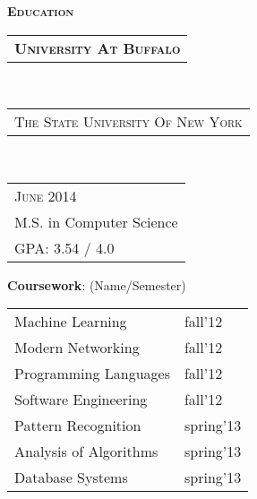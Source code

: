 \documentclass[10pt,letterpaper,oneside]{article}
\begin{document}
    \hspace{2ex}
    \begin{minipage}[t]{0.33\textwidth}
        \vspace{0pt}
        \textcolor{light-gray}{\textbf{\large E\textsc{ducation}}}
        \vspace{10pt}\\
        \begin{tabular}{c}
            \textbf{\normalsize U\textsc{niversity} A\textsc{t} B\textsc{uffalo}}
        \end{tabular}\\
        \textcolor{light-gray}{
            \begin{tabular}{l}
                {\small T\textsc{he} S\textsc{tate} U\textsc{niversity} O\textsc{f} N\textsc{ew} Y\textsc{ork}}
            \end{tabular}
        }\\ 
        \begin{tabular}{l}
            {\small J\textsc{une} 2014}\\
            {\small M.S. in Computer Science }\\
            {\small GPA: 3.54 / 4.0}
        \end{tabular}
        \vspace{0pt}
        \begin{adjustwidth}{7pt}{0pt}
            {\small \textbf{Coursework}: (Name/Semester)}\\
        \end{adjustwidth}
        \vspace{-11pt}
        \begin{adjustwidth}{7pt}{0pt}
            \begin{tabular}{ll}
                { \footnotesize Machine Learning } & {\footnotesize fall'12}\\                
                { \footnotesize Modern Networking } & {\footnotesize fall'12}\\
                { \footnotesize Programming Languages } & {\footnotesize fall'12}\\
                { \footnotesize Software Engineering } & {\footnotesize fall'12}\\
                { \footnotesize Pattern Recognition } & {\footnotesize spring'13}\\
                { \footnotesize Analysis of Algorithms } & {\footnotesize spring'13}\\
                { \footnotesize Database Systems } & {\footnotesize spring'13}\\

\end{tabular}
\end{adjustwidth}
\end{minipage}
\end{document}
